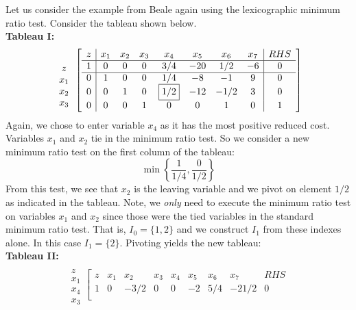 \begin{example}
Let us consider the example from Beale again using the lexicographic minimum ratio test. Consider the tableau shown below. \\
\noindent\textbf{Tableau I:}
\begin{displaymath}
\begin{array}{c}
\\z\\x_1\\x_2\\x_3
\end{array}\left[
\begin{array}{c|ccccccc|c}
z & x_1 & x_2 & x_3 & x_4 & x_5 & x_6 & x_7 & RHS\\
\hline
1 & 0 & 0 & 0 & 3/4 & -20 & 1/2  & -6 & 0\\
\hline
0 & 1 & 0 & 0 & 1/4 & -8  & -1   & 9  & 0\\
0 & 0 & 1 & 0 & \fbox{1/2} & -12 & -1/2 & 3  & 0\\
0 & 0 & 0 & 1 & 0   &  0  & 1    & 0  & 1
\end{array}\right]
\end{displaymath}
Again, we chose to enter variable $x_4$ as it has the most positive reduced cost. Variables $x_1$ and $x_2$ tie in the minimum ratio test. So we consider a new minimum ratio test on the first column of the tableau:
\begin{equation}
\min\left\{\frac{1}{1/4}, \frac{0}{1/2}\right\}
\end{equation}
From this test, we see that $x_2$ is the leaving variable and we pivot on element $1/2$ as indicated in the tableau. Note, we \textit{only} need to execute the minimum ratio test on variables $x_1$ and $x_2$ since those were the tied variables in the standard minimum ratio test. That is, $I_0 = \{1,2\}$ and we construct $I_1$ from these indexes alone. In this case $I_1 = \{2\}$. Pivoting yields the new tableau:\\
\noindent\textbf{Tableau II:}
\begin{displaymath}
\begin{array}{c}
\\z\\x_1\\x_4\\x_3
\end{array}\left[
\begin{array}{c|ccccccc|c}
z & x_1 & x_2 & x_3 & x_4 & x_5 & x_6 & x_7 & RHS\\
\hline
1 & 0 & -3/2 & 0 & 0 & -2 & 5/4  & -21/2 & 0\\

\end{array}
\end{displaymath}
\end{example}
